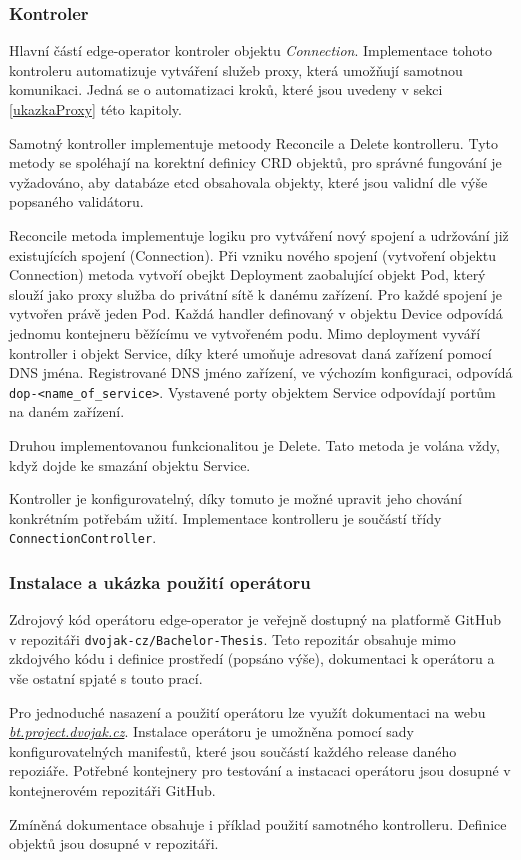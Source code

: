 \subsubsection*{Kontroler}
Hlavní částí edge-operator kontroler objektu \textit{Connection}. Implementace tohoto kontroleru automatizuje vytváření služeb proxy, která umožňují samotnou komunikaci. Jedná se o automatizaci kroků, které jsou uvedeny v sekci \ref{ukazkaProxy} této kapitoly.

Samotný kontroller implementuje metoody Reconcile a Delete kontrolleru. Tyto metody se spoléhají na korektní definicy CRD objektů, pro správné fungování je vyžadováno, aby databáze etcd obsahovala objekty, které jsou validní dle výše popsaného validátoru.

Reconcile metoda implementuje logiku pro vytváření nový spojení a udržování již existujících spojení (Connection). Při vzniku nového spojení (vytvoření objektu Connection) metoda vytvoří obejkt Deployment zaobalující objekt Pod, který slouží jako proxy služba do privátní sítě k danému zařízení. Pro každé spojení je vytvořen právě jeden Pod. Každá handler definovaný v objektu Device odpovídá jednomu kontejneru běžícímu ve vytvořeném podu. Mimo deployment vyváří kontroller i objekt Service, díky které umoňuje adresovat daná zařízení pomocí DNS jména. Registrované DNS jméno zařízení, ve výchozím konfiguraci, odpovídá \verb|dop-<name_of_service>|. Vystavené porty objektem Service odpovídají portům na daném zařízení. 

Druhou implementovanou funkcionalitou je Delete. Tato metoda je volána vždy, když dojde ke smazání objektu Service.

Kontroller je konfigurovatelný, díky tomuto je možné upravit jeho chování konkrétním potřebám užití. Implementace kontrolleru je součástí třídy \verb|ConnectionController|. 

\subsubsection*{Instalace a ukázka použití operátoru}
Zdrojový kód operátoru edge-operator je veřejně dostupný na platformě GitHub v repozitáři \verb|dvojak-cz/Bachelor-Thesis|. Teto repozitár obsahuje mimo zkdojvého kódu i definice prostředí (popsáno výše), dokumentaci k operátoru a vše ostatní spjaté s touto prací.

Pro jednoduché nasazení a použití operátoru lze využít dokumentaci na webu\\\href{https://bt.project.dvojak.cz/}{\textit{bt.project.dvojak.cz}}. Instalace operátoru je umožněna pomocí sady konfigurovatelných manifestů, které jsou součástí každého release daného repoziáře. Potřebné kontejnery pro testování a instacaci operátoru jsou dosupné v kontejnerovém repozitáři GitHub.

Zmíněná dokumentace obsahuje i příklad použití samotného kontrolleru. Definice objektů jsou dosupné v repozitáři.  

